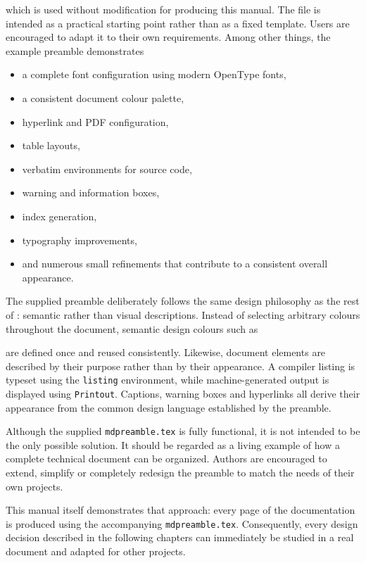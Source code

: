 \documentclass[
11pt,
a4paper,
oneside
]{scrbook}
\begin{document}


which is used without modification for producing this manual.
The file is intended as a practical starting point rather than as a fixed
template. Users are encouraged to adapt it to their own requirements.
Among other things, the example preamble demonstrates
\begin{itemize}
	\item a complete font configuration using modern OpenType fonts,
	\item a consistent document colour palette,
	\item hyperlink and PDF configuration,
	\item table layouts,
	\item verbatim environments for source code,
	\item warning and information boxes,
	\item index generation,
	\item typography improvements,
	\item and numerous small refinements that contribute to a consistent
	overall appearance.
\end{itemize}
The supplied preamble deliberately follows the same design philosophy as
the rest of \MDWordmark: semantic rather than visual descriptions.
Instead of selecting arbitrary colours throughout the document, semantic
design colours such as




are defined once and reused consistently.
Likewise, document elements are described by their purpose rather than by
their appearance. A compiler listing is typeset using the
\texttt{listing} environment, while machine-generated output is displayed
using \texttt{Printout}. Captions, warning boxes and hyperlinks all
derive their appearance from the common design language established by
the preamble.

Although the supplied \texttt{mdpreamble.tex} is fully functional, it is
not intended to be the only possible solution. It should be regarded as a
living example of how a complete technical document can be organized.
Authors are encouraged to extend, simplify or completely redesign the
preamble to match the needs of their own projects.

This manual itself demonstrates that approach: every page of the
documentation is produced using the accompanying
\texttt{mdpreamble.tex}. Consequently, every design decision described in
the following chapters can immediately be studied in a real document and
adapted for other projects.
 
\end{document}
